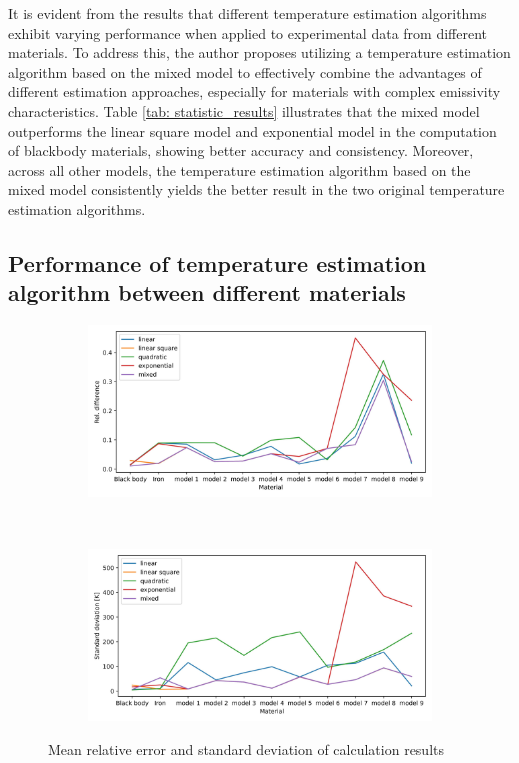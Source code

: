 It is evident from the results that different temperature estimation algorithms 
exhibit varying performance when applied to experimental data from different 
materials. To address this, the author proposes utilizing a temperature estimation 
algorithm based on the mixed model to effectively combine the advantages of 
different estimation approaches, especially for materials with complex emissivity 
characteristics. Table \ref{tab: statistic_results} illustrates that the mixed 
model outperforms the linear square model and exponential model in the 
computation of blackbody materials, showing better accuracy and consistency. 
Moreover, across all other models, the temperature estimation algorithm based 
on the mixed model consistently yields the better result in the two 
original temperature estimation algorithms.

\subsection{Performance of temperature estimation algorithm between different materials}

\begin{figure}[htbp]
    \centering
    \begin{subfigure}{\textwidth}
        \includegraphics[width=\textwidth]{figures/diff_rel.jpg}
    \end{subfigure}\\
    \begin{subfigure}{\textwidth}
        \includegraphics[width=\textwidth]{figures/diff_std.jpg}
    \end{subfigure}
    \caption{Mean relative error and standard deviation of calculation results}
    \label{fig: result_final_analysis}
\end{figure}

